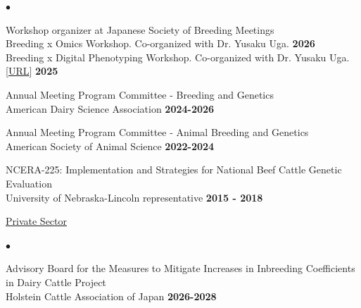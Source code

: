 \documentclass[margin,line,10pt]{res}
\newenvironment{list2}{
  \begin{list}{$\bullet$}{%
      \setlength{\itemsep}{0in}
      \setlength{\parsep}{0in} \setlength{\parskip}{0in}
      \setlength{\topsep}{0in} \setlength{\partopsep}{0in} 
      \setlength{\leftmargin}{0.2in}}}{\end{list}}
\begin{document}
\begin{resume}
\begin{list2}
  \vspace{0.3cm}


\item Workshop organizer at Japanese Society of Breeding Meetings\\ 
  Breeding x Omics Workshop. Co-organized with Dr. Yusaku Uga.  \hfill \textbf{2026} \\ 

 Breeding x Digital Phenotyping Workshop. Co-organized with Dr. Yusaku Uga.  [\textcolor{blue}{\href{https://doi.org/10.1270/jsbbr.28.W01}{URL}}] \hfill \textbf{2025} \\

  \vspace{0.3cm}



  \item Annual Meeting Program Committee - Breeding and Genetics   \\
American Dairy Science Association   \hfill \textbf{2024-2026}\\

\vspace{0.3cm}

\item Annual Meeting Program Committee - Animal Breeding and Genetics   \\
American Society of Animal Science   \hfill \textbf{2022-2024}\\

\vspace{0.3cm}


\item NCERA-225: Implementation and Strategies for National Beef Cattle Genetic Evaluation \\ University of Nebraska-Lincoln representative \hfill  \textbf{2015 - 2018}\\

\end{list2}



\begin{flushleft}
  \hspace{0.3cm} \underline{Private Sector}
  \end{flushleft}
  \begin{list2}

  \item Advisory Board for the Measures to Mitigate Increases in Inbreeding Coefficients in Dairy Cattle Project \\
  Holstein Cattle Association of Japan   \hfill \textbf{2026-2028}\\


\end{list2}
\end{resume}
\end{document}

